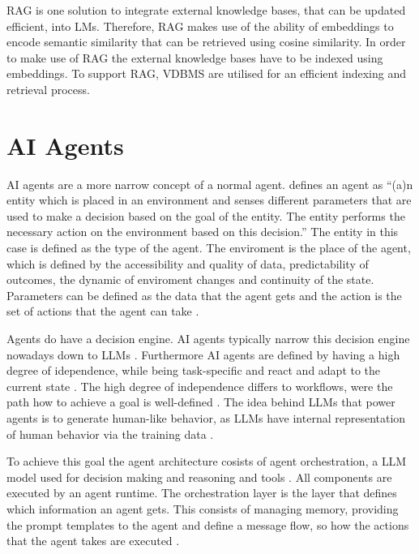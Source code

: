 \documentclass[a4paper,oneside,bibliography=totoc]{scrbook}
\begin{document}
\ac{RAG} is one solution to integrate external knowledge bases, that can be updated efficient, into \acp{LM}. Therefore, \ac{RAG} makes use of the ability of embeddings to encode semantic similarity that can be retrieved using cosine similarity. In order to make use of \ac{RAG} the external knowledge bases have to be indexed using embeddings. To support \ac{RAG}, \ac{VDBMS} are utilised for an efficient indexing and retrieval process.

\section{AI Agents}
\label{sec:ai_agents}

\ac{AI} agents are a more narrow concept of a normal agent. \citet{Dorri2018} defines an agent as \enquote{(a)n entity which is placed in an environment and senses different parameters that are used to make a decision based on the goal of the entity. The entity performs the necessary action on the environment based on this decision.} \cite[S. 28574]{Dorri2018} The entity in this case is defined as the type of the agent. The enviroment is the place of the agent, which is defined by the accessibility and quality of data, predictability of outcomes, the dynamic of enviroment changes and continuity of the state. Parameters can be defined as the data that the agent gets and the action is the set of actions that the agent can take \cite{Dorri2018}.

Agents do have a decision engine. \ac{AI} agents typically narrow this decision engine nowadays down to \acp{LLM} \cite{Sapkota2025,Park2023}. Furthermore \ac{AI} agents are defined by having a high degree of idependence, while being task-specific and react and adapt to the current state \cite{Sapkota2025,OpenAI2025}. The high degree of independence differs to workflows, were the path how to achieve a goal is well-defined \cite{Anthropic2024}. The idea behind \acp{LLM} that power agents is to generate human-like behavior, as \acp{LLM} have internal representation of human behavior via the training data \cite{Park2023}.

To achieve this goal the agent architecture cosists of agent orchestration, a \ac{LLM} model used for decision making and reasoning and tools \cite{Wiesinger2025,OpenAI2025}. All components are executed by an agent runtime. The orchestration layer is the layer that defines which information an agent gets. This consists of managing memory, providing the prompt templates to the agent and define a message flow, so how the actions that the agent takes are executed \cite{Wiesinger2025}.
\end{document}
